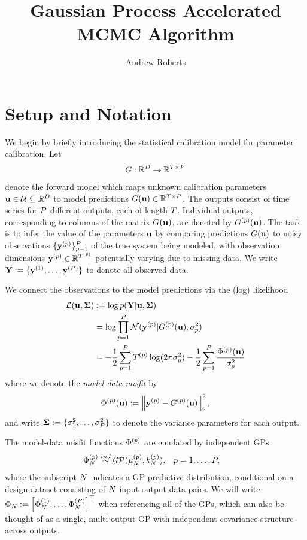 \documentclass[12pt]{article}
\title{Gaussian Process Accelerated MCMC Algorithm}
\author{Andrew Roberts}
\begin{document}
\section{Setup and Notation}
We begin by briefly introducing the statistical calibration model for parameter calibration. Let 
\begin{align*}
\fwd: \R^{\Npar} \to \R^{\Ntime \times \Nobj}
\end{align*}
denote the forward model which maps unknown calibration parameters $\bpar \in \parSpace \subseteq \R^{\Npar}$ to model predictions 
$\fwd(\bpar) \in \R^{\Ntime \times \Nobj}$. The outputs consist of time series for $\Nobj$ different outputs, each of length $\Ntime$. 
Individual outputs, corresponding to columns of the matrix $\fwd(\bpar)$, are denoted by $\indexObj{\fwd}(\bpar)$. 
The task is to infer the value of the parameters $\bpar$ by comparing predictions $\fwd(\bpar)$ to noisy 
observations $\{\indexObj{\bstate}\}_{\objIdx=1}^{\Nobj}$ of the true system being modeled, with observation dimensions 
$\indexObj{\bstate} \in \R^{\indexObj{\Ntime}}$ potentially varying due to missing data. We write 
$\stateMat := \{\indexObj[1]{\bstate}, \dots, \indexObj[\Nobj]{\bstate} \}$ to denote all observed data. 

We connect the observations to the model predictions via the (log) likelihood 
\begin{align}
\llik(\bpar, \CovObs) 
&:= \log p(\stateMat|\bpar, \CovObs) \\
&= \log \prod_{\objIdx=1}^{\Nobj} \Gaussian(\indexObj{\bstate} | \indexObj{\fwd}(\bpar), \sdObs^2_{\objIdx}) \\
&= -\frac{1}{2} \sum_{\objIdx=1}^{\Nobj} \indexObj{\Ntime} \log(2\pi \sdObs^2_{\objIdx}) - \frac{1}{2} \sum_{\objIdx=1}^{\Nobj} \frac{\indexObj{\SSR}(\bpar)}{\sdObs^2_{\objIdx}}
\end{align}
where we denote the \textit{model-data misfit} by 
\begin{align}
\indexObj{\SSR}(\bpar) := \norm{\indexObj{\bstate} - \indexObj{\fwd}(\bpar)}_2^2,
\end{align}
 and write $\CovObs := \{\sdObs^2_1, \dots, \sdObs^2_{\Nobj}\}$ to denote the variance parameters for each output. 
 
 The model-data misfit functions $\indexObj{\SSR}$ are emulated by independent GPs
 \begin{align}
&\SSRVecPredOut{\Ndesign}{\objIdx} \overset{ind}{\sim} \GP(\GPMeanPredOut{\Ndesign}{\objIdx}, \GPKerPredOut{\Ndesign}{\objIdx}), &&\objIdx = 1, \dots, \Nobj,
 \end{align}
 where the subscript $\Ndesign$ indicates a GP predictive distribution, conditional on a design dataset consisting of $\Ndesign$ input-output data pairs. We will write 
 $\indexDesign[\Ndesign]{\SSR} := \left[\SSRVecPredOut{\Ndesign}{1}, \dots, \SSRVecPredOut{\Ndesign}{\Nobj}\right]^\top$ when referencing all of the GPs, which can 
 also be thought of as a single, multi-output GP with independent covariance structure across outputs. 
 
\end{document}

